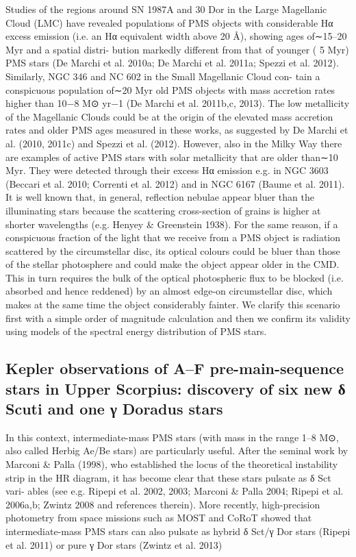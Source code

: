 \documentclass[../Main.tex]{subfiles}
\begin{document}
{Studies of the regions around SN 1987A and 30 Dor in the
Large Magellanic Cloud (LMC) have revealed populations of PMS
objects with considerable Hα excess emission (i.e. an Hα equivalent
width above 20 Å), showing ages of∼15–20 Myr and a spatial distri-
bution markedly different from that of younger ( 5 Myr) PMS stars
(De Marchi et al. 2010a; De Marchi et al. 2011a; Spezzi et al. 2012).
Similarly, NGC 346 and NC 602 in the Small Magellanic Cloud con-
tain a conspicuous population of∼20 Myr old PMS objects with
mass accretion rates higher than 10−8 M⊙ yr−1 (De Marchi et al.
2011b,c, 2013). The low metallicity of the Magellanic Clouds could be at the
origin of the elevated mass accretion rates and older PMS ages
measured in these works, as suggested by De Marchi et al. (2010,
2011c) and Spezzi et al. (2012). However, also in the Milky Way
there are examples of active PMS stars with solar metallicity that
are older than∼10 Myr. They were detected through their excess
Hα emission e.g. in NGC 3603 (Beccari et al. 2010; Correnti et al.
2012) and in NGC 6167 (Baume et al. 2011).
It is well known that, in general, reflection nebulae appear bluer
than the illuminating stars because the scattering cross-section of
grains is higher at shorter wavelengths (e.g. Henyey & Greenstein
1938). For the same reason, if a conspicuous fraction of the light
that we receive from a PMS object is radiation scattered by the
circumstellar disc, its optical colours could be bluer than those of
the stellar photosphere and could make the object appear older in
the CMD. This in turn requires the bulk of the optical photospheric
flux to be blocked (i.e. absorbed and hence reddened) by an almost
edge-on circumstellar disc, which makes at the same time the object
considerably fainter. We clarify this scenario first with a simple
order of magnitude calculation and then we confirm its validity
using models of the spectral energy distribution of PMS stars.
\subsection{Kepler observations of A–F pre-main-sequence stars in Upper Scorpius:
discovery of six new δ Scuti and one γ Doradus stars}

In this context, intermediate-mass PMS stars (with mass in the
range 1–8 M⊙, also called Herbig Ae/Be stars) are particularly
useful. After the seminal work by Marconi & Palla (1998), who
established the locus of the theoretical instability strip in the HR
diagram, it has become clear that these stars pulsate as δ Sct vari-
ables (see e.g. Ripepi et al. 2002, 2003; Marconi & Palla 2004;
Ripepi et al. 2006a,b; Zwintz 2008 and references therein). More
recently, high-precision photometry from space missions such as MOST and CoRoT showed that   intermediate-mass PMS stars can
also pulsate as hybrid δ Sct/γ Dor stars (Ripepi et al. 2011) or pure
γ Dor stars (Zwintz et al. 2013)

}
\end{document}
